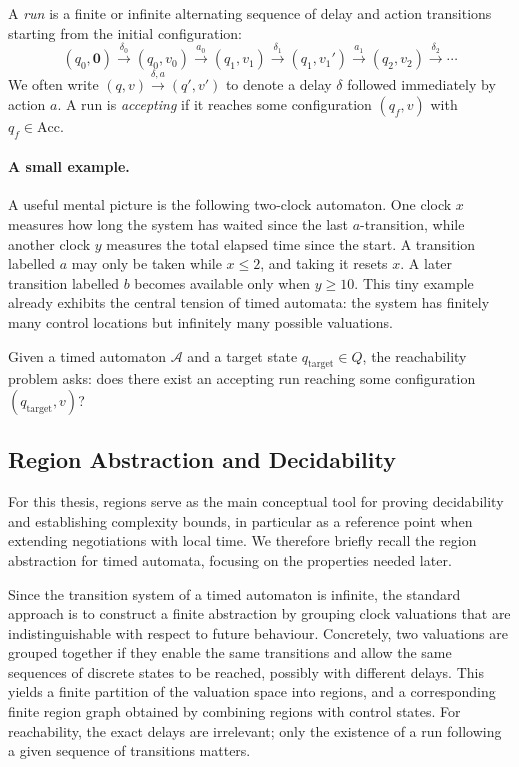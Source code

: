 A \emph{run} is a finite or infinite alternating sequence of delay and action transitions starting from the initial configuration:
\[
(q_0, \mathbf{0}) \xrightarrow{\delta_0} (q_0, v_0) \xrightarrow{a_0} (q_1, v_1) \xrightarrow{\delta_1} (q_1, v_1') \xrightarrow{a_1} (q_2, v_2) \xrightarrow{\delta_2} \cdots
\]
We often write $(q, v) \xrightarrow{\delta, a} (q', v')$ to denote a delay $\delta$ followed immediately by action $a$. A run is \emph{accepting} if it reaches some configuration $(q_f, v)$ with $q_f \in \text{Acc}$.

\paragraph{A small example.}
A useful mental picture is the following two-clock automaton. One clock $x$ measures how long the system has waited since the last $a$-transition, while another clock $y$ measures the total elapsed time since the start. A transition labelled $a$ may only be taken while $x \leq 2$, and taking it resets $x$. A later transition labelled $b$ becomes available only when $y \geq 10$. This tiny example already exhibits the central tension of timed automata: the system has finitely many control locations but infinitely many possible valuations.

\begin{definition}
Given a timed automaton $\mathcal{A}$ and a target state $q_{\text{target}} \in Q$, the \textsf{reachability problem} asks: does there exist an accepting run reaching some configuration $(q_{\text{target}}, v)$?
\end{definition}

\subsection{Region Abstraction and Decidability~\cite{}}

For this thesis, regions serve as the main conceptual tool for proving decidability and establishing complexity bounds, in particular as a reference point when extending negotiations with local time. We therefore briefly recall the region abstraction for timed automata, focusing on the properties needed later.

Since the transition system of a timed automaton is infinite, the standard approach is to construct a finite abstraction by grouping clock valuations that are indistinguishable with respect to future behaviour. Concretely, two valuations are grouped together if they enable the same transitions and allow the same sequences of discrete states to be reached, possibly with different delays. This yields a finite partition of the valuation space into regions, and a corresponding finite region graph obtained by combining regions with control states. For reachability, the exact delays are irrelevant; only the existence of a run following a given sequence of transitions matters.

